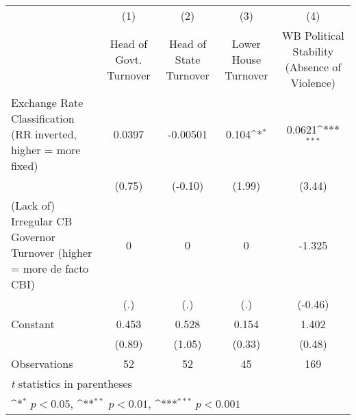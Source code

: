 {
\def\sym#1{\ifmmode^{#1}\else\(^{#1}\)\fi}
\begin{tabular*}{\linewidth}{@{\hskip\tabcolsep\extracolsep\fill}l*{4}{c}}
\hline\hline
                &\multicolumn{1}{c}{(1)}&\multicolumn{1}{c}{(2)}&\multicolumn{1}{c}{(3)}&\multicolumn{1}{c}{(4)}\\
                &\multicolumn{1}{c}{Head of Govt. Turnover}&\multicolumn{1}{c}{Head of State Turnover}&\multicolumn{1}{c}{Lower House Turnover}&\multicolumn{1}{c}{WB Political Stability (Absence of Violence)}\\
\hline
Exchange Rate Classification (RR inverted, higher = more fixed)&   0.0397         & -0.00501         &    0.104\sym{*}  &   0.0621\sym{***}\\
                &   (0.75)         &  (-0.10)         &   (1.99)         &   (3.44)         \\
[1em]
(Lack of) Irregular CB Governor Turnover (higher = more de facto CBI)&        0         &        0         &        0         &   -1.325         \\
                &      (.)         &      (.)         &      (.)         &  (-0.46)         \\
[1em]
Constant        &    0.453         &    0.528         &    0.154         &    1.402         \\
                &   (0.89)         &   (1.05)         &   (0.33)         &   (0.48)         \\
\hline
Observations    &       52         &       52         &       45         &      169         \\
\hline\hline
\multicolumn{5}{l}{\footnotesize \textit{t} statistics in parentheses}\\
\multicolumn{5}{l}{\footnotesize \sym{*} \(p<0.05\), \sym{**} \(p<0.01\), \sym{***} \(p<0.001\)}\\
\end{tabular*}
}
